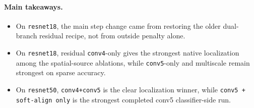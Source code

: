 \documentclass[11pt]{article}
\begin{document}
\paragraph{Main takeaways.}
\begin{itemize}
    \item On \texttt{resnet18}, the main step change came from restoring the
    older dual-branch residual recipe, not from outside penalty alone.
    \item On \texttt{resnet18}, residual \texttt{conv4}-only gives the strongest
    native localization among the spatial-source ablations, while
    \texttt{conv5}-only and multiscale remain strongest on sparse accuracy.
    \item On \texttt{resnet50}, \texttt{conv4+conv5} is the clear localization
    winner, while \texttt{conv5 + soft-align only} is the strongest completed
    conv5 classifier-side run.
\end{itemize}
\end{document}

